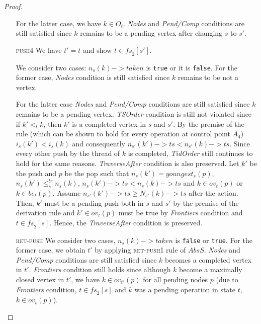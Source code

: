 \begin{proof}
\begin{itemize}
For the latter case, we have $k \in O_t$. \emph{Nodes} and \emph{Pend/Comp} conditions are still satisfied since $k$ remains to be a pending vertex after changing $s$ to $s'$.
\item[\textsc{push4}] We have $t' = t$ and show $t \in \mathit{fs}_2[s']$. 

We consider two cases: $n_s(k)->taken$ is \texttt{true} or it is \texttt{false}. For the former case, \emph{Nodes} condition is still satisfied since $k$ remains to be not a vertex. 

For the latter case \emph{Nodes} and \emph{Pend/Comp} conditions are still satisfied since $k$ remains to be a pending vertex. \emph{TSOrder} condition is still not violated since if $k'<_t k$, then $k'$ is a completed vertex in $s$ and $s'$. By the premise of the rule (which can be shown to hold for every operation at control point $A_4$) $i_s(k') < i_s(k)$ and consequently $n_{s'}(k')->ts < n_{s'}(k)->ts$. Since every other push by the thread of $k$ is completed, \emph{TidOrder} still continues to hold for the same reasons. \emph{TraverseAfter} condition is also preserved. Let $k'$ be the push and $p$ be the pop such that $n_s(k') = youngest_s(p)$, $n_s(k') \leq^{tr}_s n_s(k)$, $n_s(k')->ts < n_s(k)->ts$ and $k \in ov_t(p)$ or $k \in be_t(p)$. Assume $n_{s'}(k')->ts \geq N_{s'}(k)->ts$ after the action. Then, $k'$ must be a pending push both in $s$ and $s'$ by the premise of the derivation rule and $k' \in ov_t(p)$ must be true by \emph{Frontiers} condition and $t \in \mathit{fs}_2[s]$. Hence, the \emph{TraverseAfter} condition is preserved.
\item[\textsc{ret-push}] We consider two cases, $n_s(k)->taken$ is \texttt{false} or \texttt{true}. For the former case, we obtain $t'$ by applying \textsc{ret-push1} rule of $AbsS$. \emph{Nodes} and \emph{Pend/Comp} conditions are still satisfied since $k$ becomes a completed vertex in $t'$. \emph{Frontiers} condition still holds since although $k$ become a maximally closed vertex in $t'$, we have $k \in ov_{t'}(p)$ for all pending nodes $p$ (due to \emph{Frontiers} condition, $t \in \mathit{fs}_2[s]$ and $k$ was a pending operation in state $t$, $k \in ov_t(p)$). 


\end{itemize}
\end{proof}
